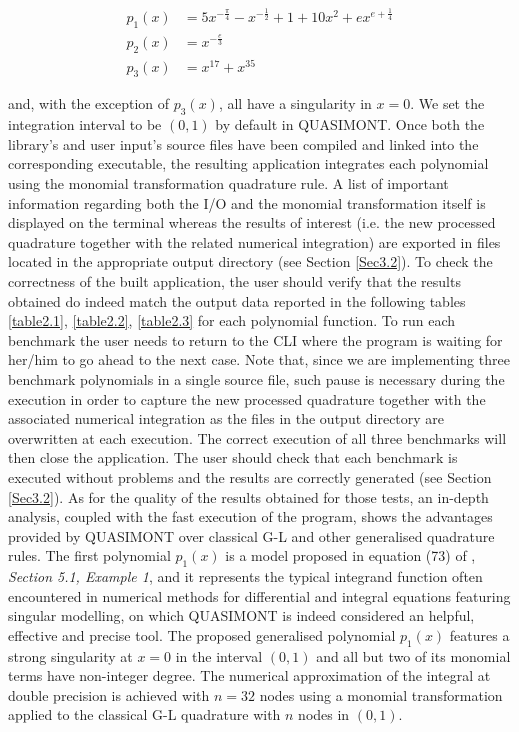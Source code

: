 \documentclass[a4paper, twosided]{book}
\begin{document}
\begin{equation*}
    \begin{split}
        p_1(x) & = 5x^{-\frac{\pi}{4}}-x^{-\frac{1}{2}}+1+10x^{2}+ex^{e+\frac{1}{4}} \\
        p_2(x) & = x^{-\frac{e}{3}} \\
        p_3(x) & = x^{17} + x^{35}
    \end{split}
\end{equation*}

\noindent
and, with the exception of $p_3(x)$, all have a singularity in $x=0$.  We set the integration interval to be $(0,1)$ by default in QUASIMONT. Once both the library's and user input's source files have been compiled and linked into the corresponding executable, the resulting application integrates each polynomial using the monomial transformation quadrature rule. A list of important information regarding both the I/O and the monomial transformation itself is displayed on the terminal whereas the results of interest (i.e. the new processed quadrature together with the related numerical integration) \color{black}  are exported in files located in the appropriate output directory (see Section \ref{Sec3.2}). To check the correctness of the built application, the user should verify that the results obtained do indeed match the output data reported in the following tables \ref{table2.1}, \ref{table2.2}, \ref{table2.3} for each polynomial function. To run each benchmark the user needs to return to the CLI where the program is waiting for her/him to go ahead to the next case. Note that, since we are implementing three benchmark polynomials in a single source file, such pause is necessary during the execution in order to capture the new processed quadrature together with the associated numerical integration as the files in the output directory are overwritten at each execution. The correct execution of all three benchmarks will then close the application. The user should check that each benchmark is executed without problems and the results are correctly generated (see Section \ref{Sec3.2}). As for the quality of the results obtained for those tests, an in-depth analysis, coupled with the fast execution of the program, shows the advantages provided by QUASIMONT over classical G-L and other generalised quadrature rules. The first polynomial $p_1(x)$ is a model proposed in equation (73) of \cite{Lombardi09}, \textsl{Section 5.1, Example 1}, and it represents the typical integrand function often encountered in numerical methods for differential and integral equations featuring singular modelling, on which QUASIMONT is indeed considered an helpful, effective and precise tool. The proposed generalised polynomial $p_1(x)$ features a strong singularity at $x=0$ in the interval $(0,1)$ and all but two of its monomial terms have non-integer degree. The numerical approximation of the integral at double precision is achieved with $n=32$ nodes using a monomial transformation applied to the classical G-L quadrature with $n$ nodes in $(0,1)$. 
\end{document}
